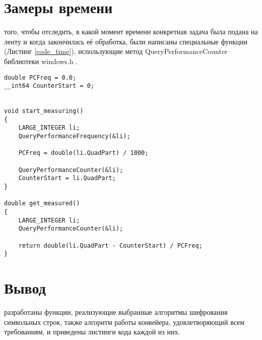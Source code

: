\section{Замеры времени}
 того, чтобы отследить, в какой момент времени конкретная задача была подана на ленту и когда закончилась её обработка, были написаны специальные функции (Листинг \ref{code_time}), использующие метод QueryPerformanceCounter библиотеки windows.h \cite{Query}.

\begin{lstlisting}[label=code_time, caption = Работа со временем]
double PCFreq = 0.0;
__int64 CounterStart = 0;


void start_measuring()
{
	LARGE_INTEGER li;
	QueryPerformanceFrequency(&li);
	
	PCFreq = double(li.QuadPart) / 1000;
	
	QueryPerformanceCounter(&li);
	CounterStart = li.QuadPart;
}

double get_measured()
{
	LARGE_INTEGER li;
	QueryPerformanceCounter(&li);
	
	return double(li.QuadPart - CounterStart) / PCFreq;
}
\end{lstlisting}

\section*{Вывод}
 разработаны функции, реализующие выбранные алгоритмы шифрования символьных строк, также алгоритм работы конвейера, удовлетворяющий всем требованиям, и приведены листинги кода каждой из них.

